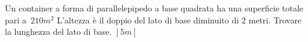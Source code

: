 \begin{multicols}{2}
\begin{esercizio}[\Ast]
 \label{ese:3.150}
Un container a forma di parallelepipedo a base quadrata ha una superficie
totale pari a~\(210\unit{m^2}\) L'altezza è il doppio del lato di base 
diminuito 
di \(2\) metri. Trovare la lunghezza del lato di base.
\hfill\(\left[5\unit{m}\right]\)
\end{esercizio}

% 
%  
% 

\end{multicols}
